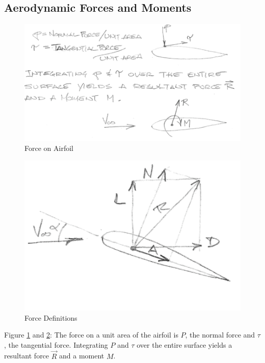 \documentclass[draft=false, titlepage]{article}
\begin{document}
\subsection{Aerodynamic Forces and Moments}
\begin{figure}[ht]
    \centering
    \includegraphics[width=0.9\linewidth]{Figures/p2_1.png}
    \caption{Force on Airfoil}
    \label{fig:p2_1}
\end{figure}

\begin{figure}[ht]
    \centering
    \includegraphics[width=0.5\linewidth]{Figures/p2_2.png}
    \caption{Force Definitions}
    \label{fig:p2_2}
\end{figure}

Figure \ref{fig:p2_1} and \ref{fig:p2_2}: The force on a unit area of the airfoil is $P$, the normal force and $\tau$, the tangential force. Integrating $P$ and $\tau$ over the entire surface yields a resultant force $\vec{R}$ and a moment $M$.
\end{document}
